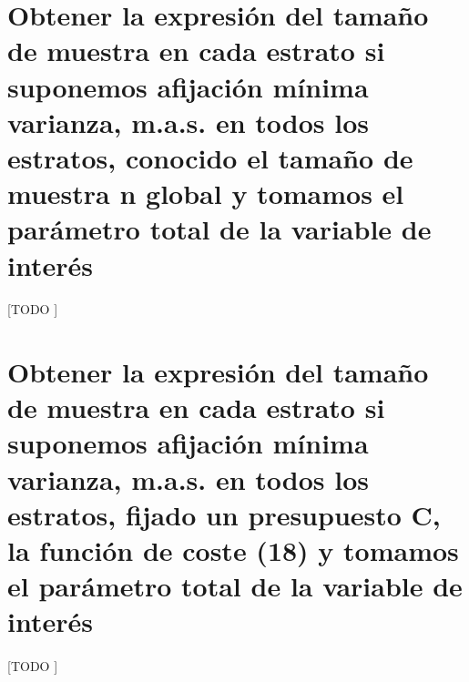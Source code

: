 \documentclass{article}
\begin{document}
  \maketitle


  \section{Obtener la expresión del tamaño de muestra en cada estrato si suponemos afijación mínima varianza,  m.a.s. en todos los estratos, conocido el tamaño de muestra n global y tomamos el parámetro total de la variable de interés}

    \paragraph{}
    [TODO ]

  \section{Obtener la expresión del tamaño de muestra en cada estrato si suponemos afijación mínima varianza,  m.a.s. en todos los estratos, fijado un presupuesto C, la función de coste (18)  y tomamos el parámetro total de la variable de interés}

    \paragraph{}
    [TODO ]



  \nocite{muest2017}
  \nocite{sarndal2003model}

  
  
\end{document}
